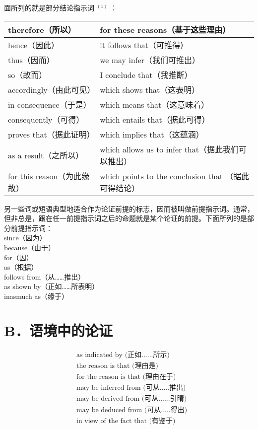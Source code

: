 面所列的就是部分结论指示词 ${ }^{(1)}$ ：

\begin{center}
\begin{tabular}{|l|l|}
\hline
therefore（所以） & for these reasons（基于这些理由） \\
\hline
hence（因此） & it follows that（可推得） \\
\hline
thus（因而） & we may infer（我们可推出） \\
\hline
so（故而） & I conclude that（我推断） \\
\hline
accordingly（由此可见） & which shows that（这表明） \\
\hline
in consequence（于是） & which means that（这意味着） \\
\hline
consequently（可得） & which entails that（据此可得） \\
\hline
proves that（据此证明） & which implies that（这蕴涵） \\
\hline
as a result（之所以） & which allows us to infer that（据此我们可以推出） \\
\hline
for this reason（为此缘故） & which points to the conclusion that （据此可得结论） \\
\hline
\end{tabular}
\end{center}

另一些词或短语典型地适合作为论证前提的标志，因而被叫做前提指示词。通常，但非总是，跟在任一前提指示词之后的命题就是某个论证的前提。下面所列的是部分前提指示词：\\
since（因为）\\
because（由于）\\
for（因）\\
as（根据）\\
follows from（从……推出）\\
as shown by（正如……所表明）\\
inasmuch as（缘于）

\section*{B．语境中的论证}
$$
\begin{aligned}
& \text { as indicated by (正如......所示) } \\
& \text { the reason is that (理由是) } \\
& \text { for the reason is that (理由在于) } \\
& \text { may be inferred from (可从.....推出) } \\
& \text { may be derived from (可从......引晴) } \\
& \text { may be deduced from (可从.....得出) } \\
& \text { in view of the fact that (有鉴于) }
\end{aligned}
$$

